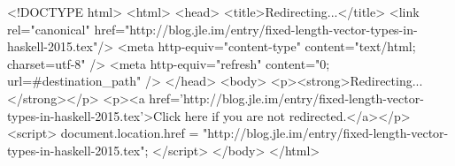<!DOCTYPE html>
<html>
<head>
<title>Redirecting...</title>
<link rel="canonical" href="http://blog.jle.im/entry/fixed-length-vector-types-in-haskell-2015.tex"/>
<meta http-equiv="content-type" content="text/html; charset=utf-8" />
<meta http-equiv="refresh" content="0; url=#{destination_path}" />
</head>
<body>
  <p><strong>Redirecting...</strong></p>
  <p><a href='http://blog.jle.im/entry/fixed-length-vector-types-in-haskell-2015.tex'>Click here if you are not redirected.</a></p>
  <script>
    document.location.href = "http://blog.jle.im/entry/fixed-length-vector-types-in-haskell-2015.tex";
  </script>
</body>
</html>
